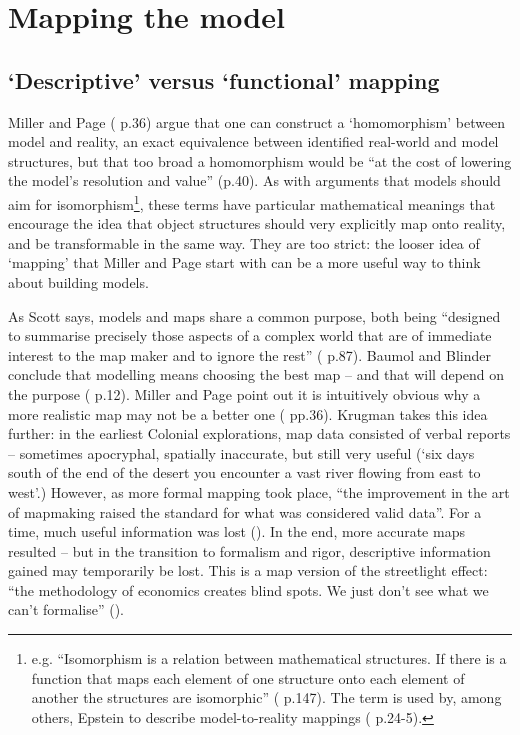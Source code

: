 \section{Mapping the model \label{sec:mapping}}

\subsection{`Descriptive' versus `functional' mapping \label{sec:code_vs_function}}

Miller and Page (\citeyear{miller_complex_2007} p.36) argue that one can construct a `homomorphism' between model and reality, an exact equivalence between identified real-world and model structures, but that too broad a homomorphism would be ``at the cost of lowering the model's resolution and value'' (p.40). As with arguments that models should aim for isomorphism\footnote{e.g. ``Isomorphism is a relation between mathematical structures. If there is a function that maps each element of one structure onto each element of another the structures are isomorphic'' (\citealt{downes_importance_1992} p.147). The term is used by, among others, Epstein to describe model-to-reality mappings (\citealt{epstein_generative_2006} p.24-5).}, these terms have particular mathematical meanings that encourage the idea that object structures should very explicitly map onto reality, and be transformable in the same way. They are too strict: the looser idea of `mapping' that Miller and Page start with can be a more useful way to think about building models. 

As Scott says, models and maps share a common purpose, both being ``designed to summarise precisely those aspects of a complex world that are of immediate interest to the map maker and to ignore the rest'' (\citealt{scott_seeing_1998} p.87). Baumol and Blinder conclude that modelling means choosing the best map – and that will depend on the purpose (\citealt{baumol_economics:_2005} p.12). Miller and Page point out it is intuitively obvious why a more realistic map may not be a better one (\citealt{miller_complex_2007} pp.36). Krugman takes this idea further: in the earliest Colonial explorations, map data consisted of verbal reports – sometimes apocryphal, spatially inaccurate, but still very useful (`six days south of the end of the desert you encounter a vast river flowing from east to west'.)  However, as more formal mapping took place, ``the improvement in the art of mapmaking raised the standard for what was considered valid data''. For a time, much useful information was lost (\citealt{krugman_fall_1993}). In the end, more accurate maps resulted – but in the transition to formalism and rigor, descriptive information gained may temporarily be lost. This is a map version of the streetlight effect: ``the methodology of economics creates blind spots. We just don't see what we can't formalise'' (\citealt{krugman_how_2008}).

